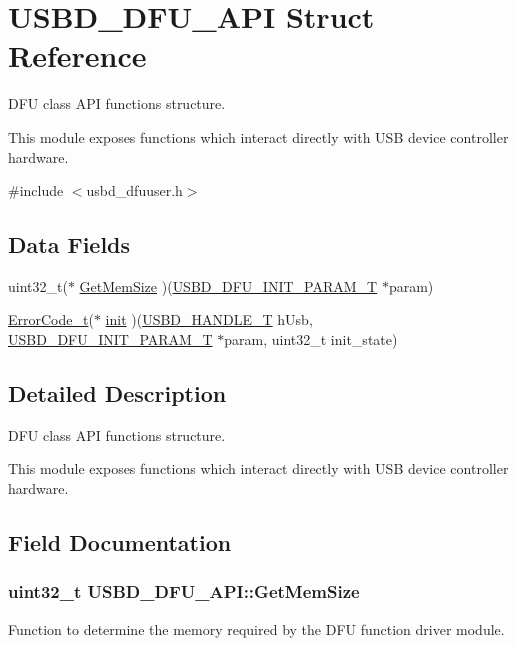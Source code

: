\hypertarget{structUSBD__DFU__API}{\section{U\-S\-B\-D\-\_\-\-D\-F\-U\-\_\-\-A\-P\-I Struct Reference}
\label{structUSBD__DFU__API}
}


D\-F\-U class A\-P\-I functions structure.

This module exposes functions which interact directly with U\-S\-B device controller hardware.  




{\ttfamily \#include $<$usbd\-\_\-dfuuser.\-h$>$}

\subsection*{Data Fields}
\begin{DoxyCompactItemize}
\item 
uint32\-\_\-t($\ast$ \hyperlink{structUSBD__DFU__API_a91b64bb4209cfa9e3254bd3ba8963cdc}{Get\-Mem\-Size} )(\hyperlink{group__USBD__DFU_ga8506b43ae2bda83cc8c459114fd3fc82}{U\-S\-B\-D\-\_\-\-D\-F\-U\-\_\-\-I\-N\-I\-T\-\_\-\-P\-A\-R\-A\-M\-\_\-\-T} $\ast$param)
\item 
\hyperlink{error_8h_a905255056c349318139d94aa4523d516}{Error\-Code\-\_\-t}($\ast$ \hyperlink{structUSBD__DFU__API_a88ef3b78fca066f41f8020d39163e1e8}{init} )(\hyperlink{group__USBD__Core_gafdbb2204d929cb9d75736bd2b42342ac}{U\-S\-B\-D\-\_\-\-H\-A\-N\-D\-L\-E\-\_\-\-T} h\-Usb, \hyperlink{group__USBD__DFU_ga8506b43ae2bda83cc8c459114fd3fc82}{U\-S\-B\-D\-\_\-\-D\-F\-U\-\_\-\-I\-N\-I\-T\-\_\-\-P\-A\-R\-A\-M\-\_\-\-T} $\ast$param, uint32\-\_\-t init\-\_\-state)
\end{DoxyCompactItemize}


\subsection{Detailed Description}
D\-F\-U class A\-P\-I functions structure.

This module exposes functions which interact directly with U\-S\-B device controller hardware. 



\subsection{Field Documentation}
\hypertarget{structUSBD__DFU__API_a91b64bb4209cfa9e3254bd3ba8963cdc}{
\subsubsection[{Get\-Mem\-Size}]{\setlength{\rightskip}{0pt plus 5cm}uint32\-\_\-t U\-S\-B\-D\-\_\-\-D\-F\-U\-\_\-\-A\-P\-I\-::\-Get\-Mem\-Size}}\label{structUSBD__DFU__API_a91b64bb4209cfa9e3254bd3ba8963cdc}
Function to determine the memory required by the D\-F\-U function driver module.

